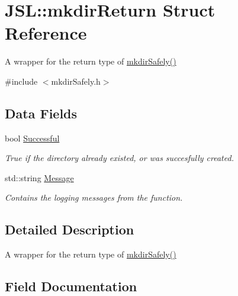 \hypertarget{structJSL_1_1mkdirReturn}{}\section{J\+SL\+:\+:mkdir\+Return Struct Reference}
\label{structJSL_1_1mkdirReturn}


A wrapper for the return type of \hyperlink{namespaceJSL_a1db6f26ec58c53d1a56375c0f1b27c77}{mkdir\+Safely()}  




{\ttfamily \#include $<$mkdir\+Safely.\+h$>$}

\subsection*{Data Fields}
\begin{DoxyCompactItemize}
\item 
bool \hyperlink{structJSL_1_1mkdirReturn_a76abe5af61a20e13756f833b79782b7f}{Successful}
\begin{DoxyCompactList}\small\item\em True if the directory already existed, or was succesfully created. \end{DoxyCompactList}\item 
std\+::string \hyperlink{structJSL_1_1mkdirReturn_a64650d2f4b3d2ca29de3a4dcfdadbd0e}{Message}
\begin{DoxyCompactList}\small\item\em Contains the logging messages from the function. \end{DoxyCompactList}\end{DoxyCompactItemize}


\subsection{Detailed Description}
A wrapper for the return type of \hyperlink{namespaceJSL_a1db6f26ec58c53d1a56375c0f1b27c77}{mkdir\+Safely()} 

\subsection{Field Documentation}
\mbox{\label{structJSL_1_1mkdirReturn_a64650d2f4b3d2ca29de3a4dcfdadbd0e}} 
